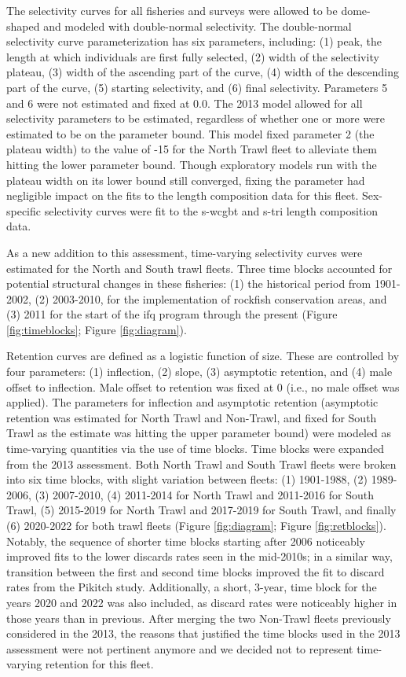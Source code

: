 \documentclass[11pt,
  english,
  letterpaper,
]{article}
\begin{document}
The selectivity curves for all fisheries and surveys were allowed to be dome-shaped and modeled with double-normal selectivity. The double-normal selectivity curve parameterization has six parameters, including: (1) peak, the length at which individuals are first fully selected, (2) width of the selectivity plateau, (3) width of the ascending part of the curve, (4) width of the descending part of the curve, (5) starting selectivity, and (6) final selectivity. Parameters 5 and 6 were not estimated and fixed at 0.0. The 2013 model allowed for all selectivity parameters to be estimated, regardless of whether one or more were estimated to be on the parameter bound. This model fixed parameter 2 (the plateau width) to the value of -15 for the North Trawl fleet to alleviate them hitting the lower parameter bound. Though exploratory models run with the plateau width on its lower bound still converged, fixing the parameter had negligible impact on the fits to the length composition data for this fleet. Sex-specific selectivity curves were fit to the \gls{s-wcgbt} and \gls{s-tri} length composition data.

As a new addition to this assessment, time-varying selectivity curves were estimated for the North and South trawl fleets. Three time blocks accounted for potential structural changes in these fisheries: (1) the historical period from 1901-2002, (2) 2003-2010, for the implementation of rockfish conservation areas, and (3) 2011 for the start of the \gls{ifq} program through the present (Figure \ref{fig:timeblocks}; Figure \ref{fig:diagram}).

Retention curves are defined as a logistic function of size. These are controlled by four parameters: (1) inflection, (2) slope, (3) asymptotic retention, and (4) male offset to inflection. Male offset to retention was fixed at 0 (i.e., no male offset was applied). The parameters for inflection and asymptotic retention (asymptotic retention was estimated for North Trawl and Non-Trawl, and fixed for South Trawl as the estimate was hitting the upper parameter bound) were modeled as time-varying quantities via the use of time blocks. Time blocks were expanded from the 2013 assessment. Both North Trawl and South Trawl fleets were broken into six time blocks, with slight variation between fleets: (1) 1901-1988, (2) 1989-2006, (3) 2007-2010, (4) 2011-2014 for North Trawl and 2011-2016 for South Trawl, (5) 2015-2019 for North Trawl and 2017-2019 for South Trawl, and finally (6) 2020-2022 for both trawl fleets (Figure \ref{fig:diagram}; Figure \ref{fig:retblocks}). Notably, the sequence of shorter time blocks starting after 2006 noticeably improved fits to the lower discards rates seen in the mid-2010s; in a similar way, transition between the first and second time blocks improved the fit to discard rates from the Pikitch study. Additionally, a short, 3-year, time block for the years 2020 and 2022 was also included, as discard rates were noticeably higher in those years than in previous. After merging the two Non-Trawl fleets previously considered in the 2013, the reasons that justified the time blocks used in the 2013 assessment were not pertinent anymore and we decided not to represent time-varying retention for this fleet.
\end{document}
